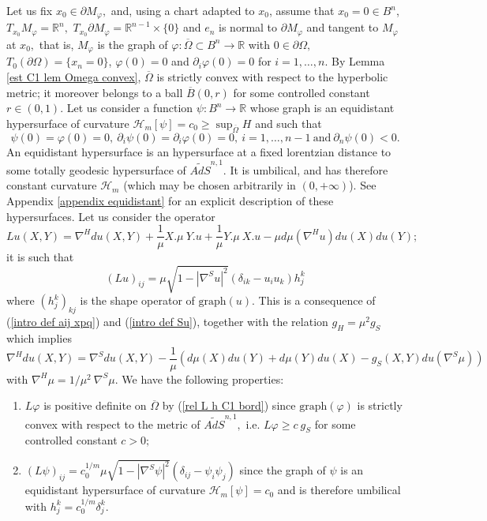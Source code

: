 \documentclass[10pt,reqno,oneside]{amsart}
\theoremstyle{definition}
\theoremstyle{remark}
\newcommand{\R}{\mathbb{R}}
\begin{document}
Let us fix $x_0\in\partial M_{\varphi},$ and, using a chart adapted to $x_0$, assume that $x_0=0\in B^n$, $T_{x_0}M_{\varphi}=\R^n,$ $T_{x_0}\partial M_{\varphi}=\R^{n-1}\times\{0\}$ and $e_n$ is normal to $\partial M_{\varphi}$ and tangent to $M_{\varphi}$ at $x_0,$ that is, $M_{\varphi}$ is the graph of $\varphi:\overline{\Omega}\subset B^n\rightarrow\R$ with $0\in\partial\Omega,$ $T_0(\partial\Omega)=\{x_n=0\}$, $\varphi(0)=0$ and $\partial_i\varphi(0)=0$ for $i=1,\ldots,n.$ By Lemma \ref{est C1 lem Omega convex}, $\overline{\Omega}$ is strictly convex with respect to the hyperbolic metric; it moreover belongs to a ball $\overline{B}(0,r)$ for some controlled constant $r\in (0,1)$. Let us consider a function $\psi: B^n\rightarrow\R$ whose graph is an equidistant hypersurface of curvature $\mathcal{H}_m[\psi]=c_0\geq\sup_{\overline{\Omega}}H$ and such that
$$\psi(0)=\varphi(0)=0,\ \partial_i\psi(0)=\partial_i\varphi(0)=0,\ i=1,\ldots,n-1\ \mbox{and}\ \partial_n\psi(0)<0.$$
An equidistant hypersurface is an hypersurface at a fixed lorentzian distance to some totally geodesic hypersurface of $\widetilde{AdS}^{n,1}.$ It is umbilical, and has therefore constant curvature $\mathcal{H}_m$ (which may be chosen arbitrarily in $(0,+\infty)$). See Appendix \ref{appendix equidistant} for an explicit description of these hypersurfaces. Let us consider the operator
\begin{equation}\label{def L C1 bord}
Lu(X,Y)=\nabla^{H}du(X,Y)+\frac{1}{\mu}X.\mu\ Y.u+\frac{1}{\mu}Y.\mu\ X.u-\mu d\mu(\nabla^{H}u)du(X)du(Y);
\end{equation}
it is such that
\begin{equation}\label{rel L h C1 bord}
(Lu)_{ij}=\mu\sqrt{1-|\nabla^S u|^2}(\delta_{ik}-u_iu_k)h^k_j
\end{equation}
where $(h^k_j)_{kj}$ is the shape operator of $\mbox{graph}(u)$. This is a consequence of (\ref{intro def aij xpq}) and (\ref{intro def Su}), together with the relation $g_H=\mu^2g_S$ which implies
$$\nabla^Hdu(X,Y)=\nabla^S du(X,Y)-\frac{1}{\mu}\left(d\mu(X)du(Y)+d\mu(Y)du(X)-g_S(X,Y)du(\nabla^S\mu)\right)$$
with $\nabla^H\mu=1/\mu^2\ \nabla^S\mu.$
We have the following properties:
\begin{enumerate}
\item $L\varphi$ is positive definite on $\overline{\Omega}$ by (\ref{rel L h C1 bord}) since $\mbox{graph}(\varphi)$ is strictly convex with respect to the metric of $\widetilde{AdS}^{n,1},$ i.e. $L\varphi\geq c\ g_S$ for some controlled constant $c>0;$
\item $(L\psi)_{ij}=c_0^{1/m}\mu\sqrt{1-|\nabla^S \psi|^2}(\delta_{ij}-\psi_i\psi_j)$ since the graph of $\psi$ is an equidistant hypersurface of curvature $\mathcal{H}_m[\psi]=c_0$ and is therefore umbilical with $h^k_j=c_0^{1/m}\delta^k_j$.
\end{enumerate}
\end{document}
